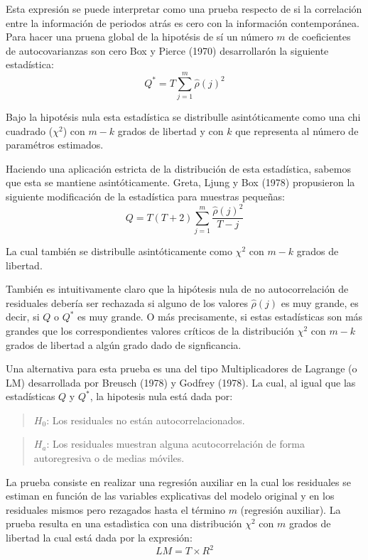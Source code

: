 \documentclass[
]{book}
\begin{document}
Esta expresión se puede interpretar como una prueba respecto de si la correlación entre la información de periodos atrás es cero con la información contemporánea. Para hacer una pruena global de la hipotésis de sí un número \(m\) de coeficientes de autocovarianzas son cero Box y Pierce (1970) desarrollarón la siguiente estadística:
\begin{equation}
    Q^* = T \sum_{j = 1}^{m} \hat{\rho} (j)^2
    \label{eq:eqautocorr2}
\end{equation}

Bajo la hipotésis nula esta estadística se distribulle asintóticamente como una chi cuadrado (\(\chi^2\)) con \(m-k\) grados de libertad y con \(k\) que representa al número de paramétros estimados.

Haciendo una aplicación estricta de la distribución de esta estadística, sabemos que esta se mantiene asintóticamente. Greta, Ljung y Box (1978) propusieron la siguiente modificación de la estadística para muestras pequeñas:
\begin{equation}
    Q = T(T + 2) \sum_{j = 1}^{m} \frac{\hat{\rho} (j)^2}{T - j}
    \label{eq:eqautocorr3}
\end{equation}

La cual también se distribulle asintóticamente como \(\chi^2\) con \(m-k\) grados de libertad.

También es intuitivamente claro que la hipótesis nula de no autocorrelación de residuales debería ser rechazada si alguno de los valores \(\hat{\rho} (j)\) es muy grande, es decir, si \(Q\) o \(Q^*\) es muy grande. O más precisamente, si estas estadísticas son más grandes que los correspondientes valores críticos de la distribución \(\chi^2\) con \(m-k\) grados de libertad a algún grado dado de signficancia.

Una alternativa para esta prueba es una del tipo Multiplicadores de Lagrange (o LM) desarrollada por Breusch (1978) y Godfrey (1978). La cual, al igual que las estadísticas \(Q\) y \(Q^*\), la hipotesis nula está dada por:

\begin{quote}
\(H_0\): Los residuales no están autocorrelacionados.
\end{quote}

\begin{quote}
\(H_a\): Los residuales muestran alguna acutocorrelación de forma autoregresiva o de medias móviles.
\end{quote}

La prueba consiste en realizar una regresión auxiliar en la cual los residuales se estiman en función de las variables explicativas del modelo original y en los residuales mismos pero rezagados hasta el término \(m\) (regresión auxiliar). La prueba resulta en una estadìstica con una distribución \(\chi^2\) con \(m\) grados de libertad la cual está dada por la expresión:
\begin{equation}
    LM = T \times R^2
    \label{eq:eqautocorr4}
\end{equation}
\end{document}
